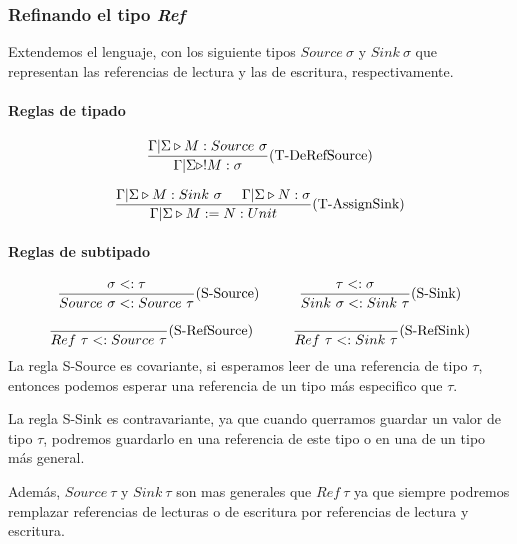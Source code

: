 \subsubsection{Refinando el tipo \textit{Ref}}
Extendemos el lenguaje, con los siguiente tipos $Source~\sigma$ y $Sink~\sigma$ que representan las referencias de lectura y las de escritura, respectivamente. 

\paragraph{Reglas de tipado}

\begin{align*}
\frac{\Gamma|\Sigma\triangleright M : Source~\sigma}{\Gamma|\Sigma\triangleright !M : \sigma}(\text{T-DeRefSource})
\end{align*}

\begin{align*}
\frac{\Gamma|\Sigma\triangleright M : Sink~\sigma\hspace*{5mm} \Gamma|\Sigma\triangleright N : \sigma}{\Gamma|\Sigma\triangleright M := N : Unit}(\text{T-AssignSink})
\end{align*}

\paragraph{Reglas de subtipado}
\begin{align*}
\frac{\sigma <: \tau}{Source~\sigma <: Source~\tau}(\text{S-Source})\hspace*{1cm}\frac{\tau <: \sigma}{Sink~\sigma <: Sink~\tau}(\text{S-Sink})
\end{align*}

\begin{align*}
\frac{}{Ref~\tau <: Source~\tau}(\text{S-RefSource})\hspace*{1cm}\frac{}{Ref~\tau <: Sink~\tau}(\text{S-RefSink})
\end{align*}
La regla S-Source es covariante, si esperamos leer de una referencia de tipo $\tau$, entonces podemos esperar una referencia de un tipo más especifico que $\tau$. 

La regla S-Sink es contravariante, ya que cuando querramos guardar un valor de tipo $\tau$, podremos guardarlo en una referencia de este tipo o en una de un tipo más general.

Además, $Source~\tau$ y $Sink~\tau$ son mas generales que $Ref~\tau$ ya que siempre podremos remplazar referencias de lecturas o de escritura por referencias de lectura y escritura.